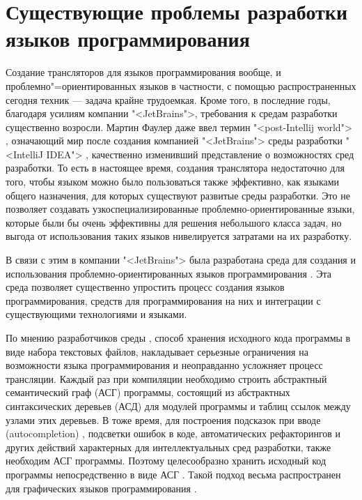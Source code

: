 \section{Существующие проблемы разработки языков программирования}
Создание трансляторов для языков программирования вообще, и проблемно"=ориентированных языков в частности, с помощью распространенных сегодня техник \cite{redDragon,hanter} --- задача крайне трудоемкая. Кроме того, в последние годы, благодаря усилиям компании "<JetBrains">, требования к средам разработки существенно возросли. Мартин Фаулер даже ввел термин "<post-Intellij world"> \cite{fowler01}, означающий мир после создания компанией "<JetBrains"> среды разработки "<IntelliJ IDEA"> \cite{intellijIDEA}, качественно изменивший представление о возможностях сред разработки. То есть в настоящее время, создания транслятора недостаточно для того, чтобы языком можно было пользоваться также эффективно, как языками общего назначения, для которых существуют развитые среды разработки. Это не позволяет создавать узкоспециализированные проблемно-ориентированные языки, которые были бы очень эффективны для решения небольшого класса задач, но выгода от использования таких языков нивелируется затратами на их разработку.

В связи с этим в компании "<JetBrains"> была разработана среда для создания и использования проблемно-ориентированных языков программирования \MPS{} \cite{dmitriev,fowler02}. Эта среда позволяет существенно упростить процесс создания языков программирования, средств для программирования на них и интеграции с существующими технологиями и языками.

По мнению разработчиков среды \MPS{}, способ хранения исходного кода программы в виде набора текстовых файлов, накладывает серьезные ограничения на возможности языка программирования и неоправданно усложняет процесс трансляции. Каждый раз при компиляции необходимо строить абстрактный семантический граф (АСГ) \cite{portableSourceCode} программы, состоящий из абстрактных синтаксических деревьев (АСД) \cite{plopAST} для модулей программы и таблиц ссылок между узлами этих деревьев. В тоже время, для построения подсказок при вводе (autocompletion) \cite{myAutocompletion}, подсветки ошибок в коде, автоматических рефакторингов \cite{fowler03} и других действий характерных для  интеллектуальных сред разработки, также необходим АСГ программы. Поэтому целесообразно хранить исходный код программы непосредственно в виде АСГ \cite{simonyi}. Такой подход весьма распространен для графических языков программирования \cite{myUMLSwitchEclipse,gmf,msdsl}.

